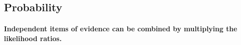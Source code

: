 \documentclass[10pt]{article}
\begin{document}




\subsection{Probability}


\paragraph{Independent items of evidence can be combined by multiplying the likelihood ratios.}
\end{document}
